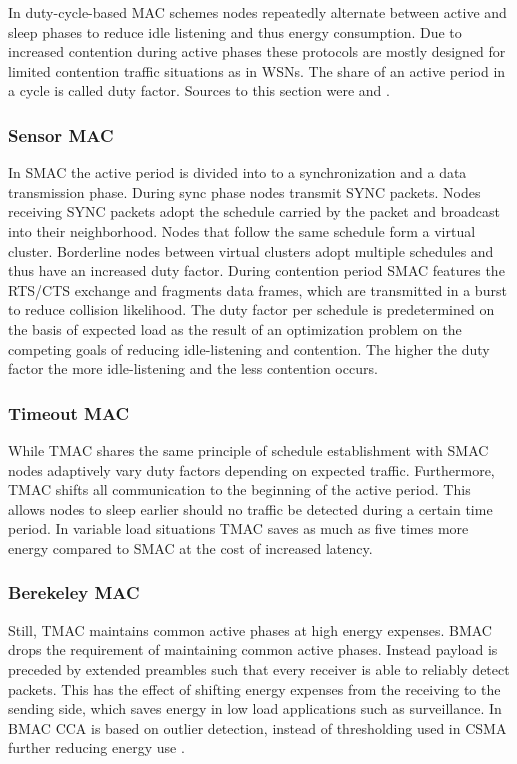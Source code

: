 In duty-cycle-based MAC schemes nodes repeatedly alternate between active and sleep phases to reduce idle listening and thus energy consumption. Due to increased contention during active phases these protocols are mostly designed for limited contention traffic situations as in WSNs. The share of an active period in a cycle is called duty factor. Sources to this section were \cite{Bachir10} and \cite{Demirkol06}.

\subsubsection{Sensor MAC}

In SMAC the active period is divided into to a synchronization and a data transmission phase. During sync phase nodes transmit SYNC packets. Nodes receiving SYNC packets adopt the schedule carried by the packet and broadcast into their neighborhood. Nodes that follow the same schedule form a virtual cluster. Borderline nodes between virtual clusters adopt multiple schedules and thus have an increased duty factor. During contention period SMAC features the RTS/CTS exchange and fragments data frames, which are transmitted in a burst to reduce collision likelihood. The duty factor per schedule is predetermined on the basis of expected load as the result of an optimization problem on the competing goals of reducing idle-listening and contention. The higher the duty factor the more idle-listening and the less contention occurs.

\subsubsection{Timeout MAC}

While TMAC shares the same principle of schedule establishment with SMAC nodes adaptively vary duty factors depending on expected traffic. Furthermore, TMAC shifts all communication to the beginning of the active period. This allows nodes to sleep earlier should no traffic be detected during a certain time period. In variable load situations TMAC saves as much as five times more energy compared to SMAC at the cost of increased latency. 

\subsubsection{Berekeley MAC}

Still, TMAC maintains common active phases at high energy expenses. BMAC drops the requirement of maintaining common active phases. Instead payload is preceded by extended preambles such that every receiver is able to reliably detect packets. This has the effect of shifting energy expenses from the receiving to the sending side, which saves energy in low load applications such as surveillance. In BMAC CCA is based on outlier detection, instead of thresholding used in CSMA further reducing energy use \cite{Polastre04}. 

